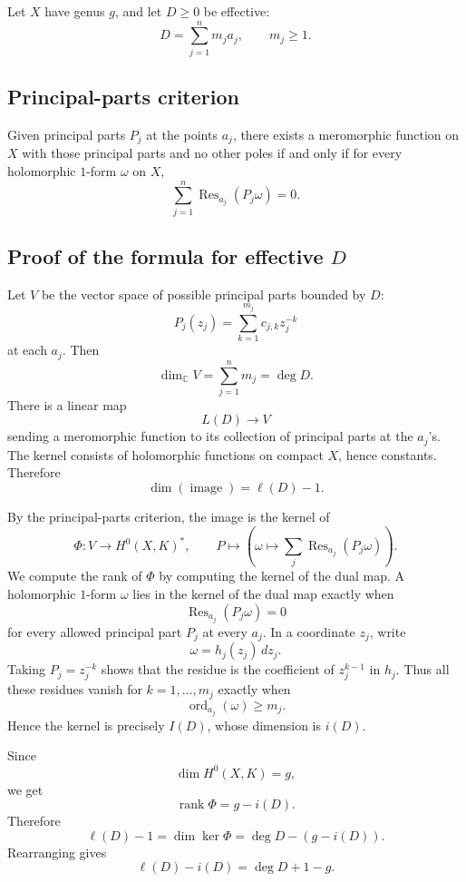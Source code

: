 \documentclass[11pt]{article}
\newcommand{\C}{\mathbb{C}}
\newcommand{\ord}{\operatorname{ord}}
\newcommand{\Res}{\operatorname{Res}}
\begin{document}
Let $X$ have genus $g$, and let $D\geq0$ be effective:
\[
 D=\sum_{j=1}^n m_j a_j,
\qquad m_j\geq1.
\]

\subsection*{Principal-parts criterion}

Given principal parts $P_j$ at the points $a_j$, there exists a meromorphic function on $X$ with those principal parts and no other poles if and only if for every holomorphic $1$-form $\omega$ on $X$,
\[
 \sum_{j=1}^n \Res_{a_j}(P_j\omega)=0.
\]

\subsection*{Proof of the formula for effective $D$}

Let $V$ be the vector space of possible principal parts bounded by $D$:
\[
 P_j(z_j)=\sum_{k=1}^{m_j}c_{j,k}z_j^{-k}
\]
at each $a_j$. Then
\[
 \dim_\C V=\sum_{j=1}^n m_j=\deg D.
\]
There is a linear map
\[
 L(D)\to V
\]
sending a meromorphic function to its collection of principal parts at the $a_j$'s. The kernel consists of holomorphic functions on compact $X$, hence constants. Therefore
\[
 \dim(\operatorname{image})=\ell(D)-1.
\]

By the principal-parts criterion, the image is the kernel of
\[
 \Phi:V\to H^0(X,K)^*,
 \qquad
 P\mapsto\left(\omega\mapsto\sum_j\Res_{a_j}(P_j\omega)\right).
\]
We compute the rank of $\Phi$ by computing the kernel of the dual map. A holomorphic $1$-form $\omega$ lies in the kernel of the dual map exactly when
\[
 \Res_{a_j}(P_j\omega)=0
\]
for every allowed principal part $P_j$ at every $a_j$.
In a coordinate $z_j$, write
\[
 \omega=h_j(z_j)\,dz_j.
\]
Taking $P_j=z_j^{-k}$ shows that the residue is the coefficient of $z_j^{k-1}$ in $h_j$. Thus all these residues vanish for $k=1,\dots,m_j$ exactly when
\[
 \ord_{a_j}(\omega)\geq m_j.
\]
Hence the kernel is precisely $I(D)$, whose dimension is $i(D)$.

Since
\[
 \dim H^0(X,K)=g,
\]
we get
\[
 \operatorname{rank}\Phi=g-i(D).
\]
Therefore
\[
 \ell(D)-1
 =
 \dim\ker\Phi
 =
 \deg D-(g-i(D)).
\]
Rearranging gives
\[
 \boxed{\ell(D)-i(D)=\deg D+1-g.}
\]
\end{document}
